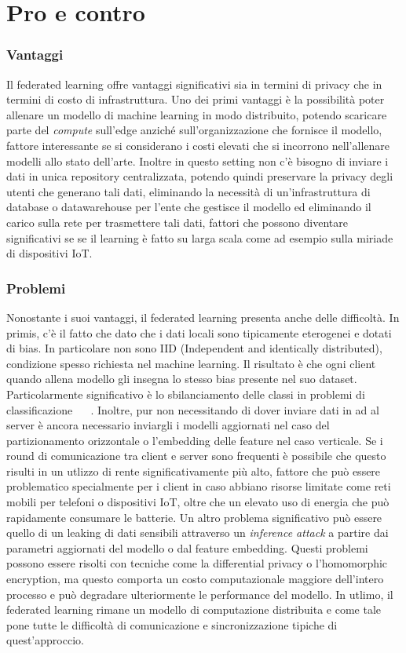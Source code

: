 \section{Pro e contro}
\subsubsection{Vantaggi}
Il federated learning offre vantaggi significativi sia in termini di 
privacy che in termini di costo di infrastruttura. 
Uno dei primi  vantaggi è la possibilità poter allenare un modello 
di machine learning in modo distribuito, potendo scaricare parte del 
\textit{compute} sull'edge anziché sull'organizzazione che fornisce 
il modello, fattore interessante se si considerano i costi elevati che 
si incorrono nell'allenare modelli allo stato dell'arte.
Inoltre in questo setting non c'è bisogno di inviare i dati in unica 
repository centralizzata, potendo quindi preservare la privacy degli
utenti che generano tali dati, eliminando la necessità di 
un'infrastruttura di database o datawarehouse per l'ente che gestisce
il modello ed eliminando il carico sulla rete per trasmettere tali
dati, fattori che possono diventare significativi se se il learning è
fatto su larga scala come ad esempio sulla miriade di dispositivi IoT.

\subsubsection{Problemi}
Nonostante i suoi vantaggi, il federated learning presenta anche delle 
difficoltà.
In primis, c'è il fatto che dato che i dati locali sono tipicamente 
eterogenei e dotati di bias. In particolare non sono IID (Independent
and identically distributed), condizione spesso richiesta nel 
machine learning. Il risultato è che ogni client quando allena modello 
gli insegna lo stesso bias presente nel suo dataset. Particolarmente
significativo è lo sbilanciamento delle classi in problemi di 
classificazione ~\cite{zhao2018flniid} ~\cite{xiao2021flci}.
Inoltre, pur non necessitando di dover inviare dati in ad al server è
ancora necessario inviargli i modelli aggiornati nel caso del 
partizionamento orizzontale o l'embedding delle feature nel caso 
verticale. Se i round di comunicazione tra client e server sono 
frequenti è possibile che questo risulti in un utlizzo di rente 
significativamente più alto, fattore che può essere problematico
specialmente per i client in caso abbiano risorse limitate come reti 
mobili per telefoni o dispositivi IoT, oltre che un elevato uso di 
energia che può rapidamente consumare le batterie.
Un altro problema significativo può essere quello di un leaking di 
dati sensibili attraverso un \textit{inference attack} a partire 
dai parametri aggiornati del modello o dal feature embedding. Questi 
problemi possono essere risolti con tecniche come la differential 
privacy o l'homomorphic encryption, ma questo comporta un costo 
computazionale maggiore dell'intero processo e può degradare ulteriormente 
le performance del modello.
In utlimo, il federated learning rimane un modello di computazione 
distribuita e come tale pone tutte le difficoltà di comunicazione e 
sincronizzazione tipiche di quest'approccio.
